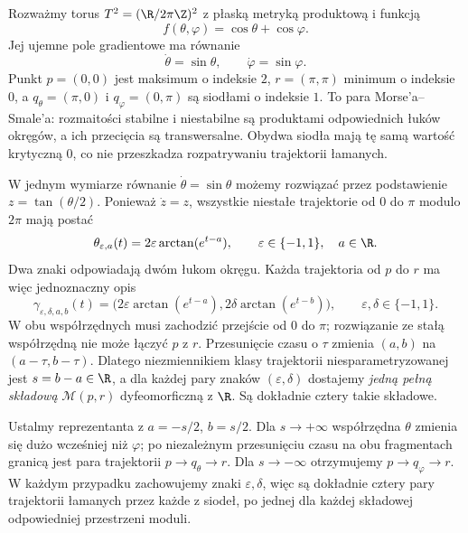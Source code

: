 \begin{przyklad}
\label{prz:morse-torus-gluing-explicit}
Rozważmy torus $T^2=(\R/2\pi\Z)^2$ z płaską
metryką produktową i funkcją
\[
 f(\theta,\varphi)=\cos\theta+\cos\varphi.
\]
Jej ujemne pole gradientowe ma równanie
\[
 \dot\theta=\sin\theta,\qquad
 \dot\varphi=\sin\varphi.
\]
Punkt $p=(0,0)$ jest maksimum o indeksie $2$,
$r=(\pi,\pi)$ minimum o indeksie $0$,
a $q_\theta=(\pi,0)$ i $q_\varphi=(0,\pi)$
są siodłami o indeksie $1$.
To para Morse'a--Smale'a:
rozmaitości stabilne i niestabilne są produktami
odpowiednich łuków okręgów, a ich
przecięcia są transwersalne.
Obydwa siodła mają tę samą wartość krytyczną $0$,
co nie przeszkadza rozpatrywaniu trajektorii łamanych.

W jednym wymiarze równanie $\dot\theta=\sin\theta$
możemy rozwiązać przez podstawienie
$z=\tan(\theta/2)$.
Ponieważ $\dot z=z$, wszystkie niestałe
trajektorie od $0$ do $\pi$ modulo $2\pi$
mają postać
\[
 \theta_{\varepsilon,a}(t)=
 2\varepsilon\arctan(e^{t-a}),\qquad
 \varepsilon\in\{-1,1\},\quad a\in\R.
\]
Dwa znaki odpowiadają dwóm łukom okręgu.
Każda trajektoria od $p$ do $r$ ma więc
jednoznaczny opis
\[
 \gamma_{\varepsilon,\delta,a,b}(t)=
 \bigl(2\varepsilon\arctan(e^{t-a}),
       2\delta\arctan(e^{t-b})\bigr),
 \qquad \varepsilon,\delta\in\{-1,1\}.
\]
W obu współrzędnych musi zachodzić przejście
od $0$ do $\pi$; rozwiązanie ze stałą
współrzędną nie może łączyć $p$ z $r$.
Przesunięcie czasu o $\tau$ zmienia
$(a,b)$ na $(a-\tau,b-\tau)$.
Dlatego niezmiennikiem klasy trajektorii
niesparametryzowanej jest
$s=b-a\in\R$, a dla każdej pary
znaków $(\varepsilon,\delta)$ dostajemy
\emph{jedną pełną składową}
$\mathcal M(p,r)$ dyfeomorficzną z $\R$.
Są dokładnie cztery takie składowe.

Ustalmy reprezentanta z $a=-s/2$, $b=s/2$.
Dla $s\to+\infty$ współrzędna $\theta$
zmienia się dużo wcześniej niż $\varphi$;
po niezależnym przesunięciu czasu na
obu fragmentach granicą jest para trajektorii
$p\to q_\theta\to r$.
Dla $s\to-\infty$ otrzymujemy
$p\to q_\varphi\to r$.
W każdym przypadku zachowujemy znaki
$\varepsilon,\delta$, więc są dokładnie
cztery pary trajektorii łamanych
przez każde z siodeł, po jednej dla
każdej składowej odpowiedniej przestrzeni moduli.


\end{przyklad}
